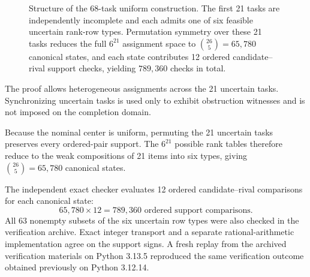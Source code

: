 \documentclass[11pt]{article}
\begin{document}
\begin{figure}[H]
\centering
{}
\caption{Structure of the 68-task uniform construction. The first 21 tasks are independently incomplete and each admits one of six feasible uncertain rank-row types. Permutation symmetry over these 21 tasks reduces the full $6^{21}$ assignment space to $\binom{26}{5}=65{,}780$ canonical states, and each state contributes 12 ordered candidate--rival support checks, yielding $789{,}360$ checks in total.}
\label{fig:s1_structure}
\end{figure}

The proof allows heterogeneous assignments across the 21 uncertain tasks. Synchronizing uncertain tasks is used only to exhibit obstruction witnesses and is not imposed on the completion domain.

Because the nominal center is uniform, permuting the 21 uncertain tasks preserves every ordered-pair support. The $6^{21}$ possible rank tables therefore reduce to the weak compositions of 21 items into six types, giving $\binom{26}{5}=65{,}780$ canonical states.

The independent exact checker evaluates 12 ordered candidate--rival comparisons for each canonical state:
\begin{equation}\label{eq:s_checks}
65{,}780\times 12 = 789{,}360\text{ ordered support comparisons.}
\end{equation}
All 63 nonempty subsets of the six uncertain row types were also checked in the verification archive. Exact integer transport and a separate rational-arithmetic implementation agree on the support signs. A fresh replay from the archived verification materials on Python 3.13.5 reproduced the same verification outcome obtained previously on Python 3.12.14.
\end{document}
